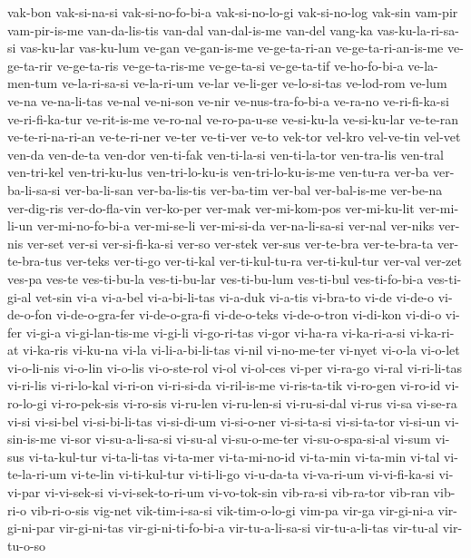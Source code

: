 {vak-bon vak-si-na-si vak-si-no-fo-bi-a vak-si-no-lo-gi vak-si-no-log
vak-sin vam-pir vam-pir-is-me van-da-lis-tis van-dal van-dal-is-me van-del
vang-ka vas-ku-la-ri-sa-si vas-ku-lar vas-ku-lum ve-gan ve-gan-is-me
ve-ge-ta-ri-an ve-ge-ta-ri-an-is-me ve-ge-ta-rir ve-ge-ta-ris
ve-ge-ta-ris-me ve-ge-ta-si ve-ge-ta-tif ve-ho-fo-bi-a ve-la-men-tum
ve-la-ri-sa-si ve-la-ri-um ve-lar ve-li-ger ve-lo-si-tas ve-lod-rom ve-lum
ve-na ve-na-li-tas ve-nal ve-ni-son ve-nir ve-nus-tra-fo-bi-a ve-ra-no
ve-ri-fi-ka-si ve-ri-fi-ka-tur ve-rit-is-me ve-ro-nal ve-ro-pa-u-se
ve-si-ku-la ve-si-ku-lar ve-te-ran ve-te-ri-na-ri-an ve-te-ri-ner ve-ter
ve-ti-ver ve-to vek-tor vel-kro vel-ve-tin vel-vet ven-da ven-de-ta
ven-dor ven-ti-fak ven-ti-la-si ven-ti-la-tor ven-tra-lis ven-tral
ven-tri-kel ven-tri-ku-lus ven-tri-lo-ku-is ven-tri-lo-ku-is-me ven-tu-ra
ver-ba ver-ba-li-sa-si ver-ba-li-san ver-ba-lis-tis ver-ba-tim ver-bal
ver-bal-is-me ver-be-na ver-dig-ris ver-do-fla-vin ver-ko-per ver-mak
ver-mi-kom-pos ver-mi-ku-lit ver-mi-li-un ver-mi-no-fo-bi-a ver-mi-se-li
ver-mi-si-da ver-na-li-sa-si ver-nal ver-niks ver-nis ver-set ver-si
ver-si-fi-ka-si ver-so ver-stek ver-sus ver-te-bra ver-te-bra-ta
ver-te-bra-tus ver-teks ver-ti-go ver-ti-kal ver-ti-kul-tu-ra
ver-ti-kul-tur ver-val ver-zet ves-pa ves-te ves-ti-bu-la ves-ti-bu-lar
ves-ti-bu-lum ves-ti-bul ves-ti-fo-bi-a ves-ti-gi-al vet-sin vi-a vi-a-bel
vi-a-bi-li-tas vi-a-duk vi-a-tis vi-bra-to vi-de vi-de-o vi-de-o-fon
vi-de-o-gra-fer vi-de-o-gra-fi vi-de-o-teks vi-de-o-tron vi-di-kon vi-di-o
vi-fer vi-gi-a vi-gi-lan-tis-me vi-gi-li vi-go-ri-tas vi-gor vi-ha-ra
vi-ka-ri-a-si vi-ka-ri-at vi-ka-ris vi-ku-na vi-la vi-li-a-bi-li-tas
vi-nil vi-no-me-ter vi-nyet vi-o-la vi-o-let vi-o-li-nis vi-o-lin vi-o-lis
vi-o-ste-rol vi-ol vi-ol-ces vi-per vi-ra-go vi-ral vi-ri-li-tas vi-ri-lis
vi-ri-lo-kal vi-ri-on vi-ri-si-da vi-ril-is-me vi-ris-ta-tik vi-ro-gen
vi-ro-id vi-ro-lo-gi vi-ro-pek-sis vi-ro-sis vi-ru-len vi-ru-len-si
vi-ru-si-dal vi-rus vi-sa vi-se-ra vi-si vi-si-bel vi-si-bi-li-tas
vi-si-di-um vi-si-o-ner vi-si-ta-si vi-si-ta-tor vi-si-un vi-sin-is-me
vi-sor vi-su-a-li-sa-si vi-su-al vi-su-o-me-ter vi-su-o-spa-si-al vi-sum
vi-sus vi-ta-kul-tur vi-ta-li-tas vi-ta-mer vi-ta-mi-no-id vi-ta-min
vi-ta-min vi-tal vi-te-la-ri-um vi-te-lin vi-ti-kul-tur vi-ti-li-go
vi-u-da-ta vi-va-ri-um vi-vi-fi-ka-si vi-vi-par vi-vi-sek-si
vi-vi-sek-to-ri-um vi-vo-tok-sin vib-ra-si vib-ra-tor vib-ran vib-ri-o
vib-ri-o-sis vig-net vik-tim-i-sa-si vik-tim-o-lo-gi vim-pa vir-ga
vir-gi-ni-a vir-gi-ni-par vir-gi-ni-tas vir-gi-ni-ti-fo-bi-a
vir-tu-a-li-sa-si vir-tu-a-li-tas vir-tu-al vir-tu-o-so
}
